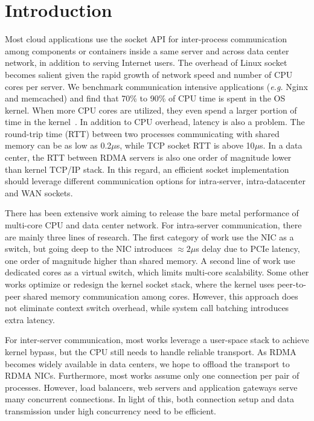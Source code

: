 \section{Introduction}
\label{sec:intro}

Most cloud applications use the socket API for inter-process communication among components or containers inside a same server and across data center network, in addition to serving Internet users. The overhead of Linux socket becomes salient given the rapid growth of network speed and number of CPU cores per server. We benchmark communication intensive applications (\textit{e.g.} Nginx and memcached) and find that 70\% to 90\% of CPU time is spent in the OS kernel. When more CPU cores are utilized, they even spend a larger portion of time in the kernel~\cite{boyd2010analysis}. In addition to CPU overhead, latency is also a problem. The round-trip time (RTT) between two processes communicating with shared memory can be as low as 0.2$\mu$s, while TCP socket RTT is above 10$\mu$s. In a data center, the RTT between RDMA servers is also one order of magnitude lower than kernel TCP/IP stack. In this regard, an efficient socket implementation should leverage different communication options for intra-server, intra-datacenter and WAN sockets.

There has been extensive work aiming to release the bare metal performance of multi-core CPU and data center network. For intra-server communication, there are mainly three lines of research. The first category of work use the NIC as a switch, but going deep to the NIC introduces $\approx2 \mu$s delay due to PCIe latency, one order of magnitude higher than shared memory. A second line of work use dedicated cores as a virtual switch, which limits multi-core scalability. Some other works optimize or redesign the kernel socket stack, where the kernel uses peer-to-peer shared memory communication among cores. However, this approach does not eliminate context switch overhead, while system call batching introduces extra latency.

For inter-server communication, most works leverage a user-space stack to achieve kernel bypass, but the CPU still needs to handle reliable transport. As RDMA becomes widely available in data centers, we hope to offload the transport to RDMA NICs. Furthermore, most works assume only one connection per pair of processes. However, load balancers, web servers and application gateways serve many concurrent connections. In light of this, both connection setup and data transmission under high concurrency need to be efficient.

